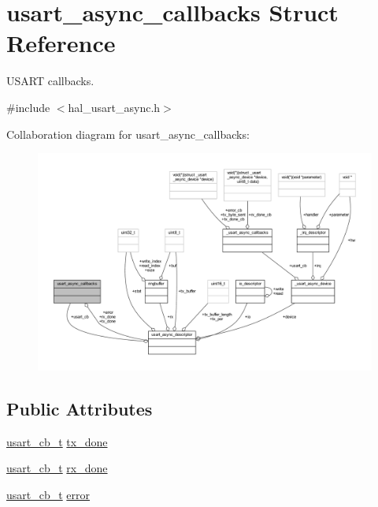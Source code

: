 \hypertarget{structusart__async__callbacks}{}\section{usart\+\_\+async\+\_\+callbacks Struct Reference}
\label{structusart__async__callbacks}


U\+S\+A\+RT callbacks.  




{\ttfamily \#include $<$hal\+\_\+usart\+\_\+async.\+h$>$}



Collaboration diagram for usart\+\_\+async\+\_\+callbacks\+:\nopagebreak
\begin{figure}[H]
\begin{center}
\leavevmode
\includegraphics[width=350pt]{structusart__async__callbacks__coll__graph}
\end{center}
\end{figure}
\subsection*{Public Attributes}
\begin{DoxyCompactItemize}
\item 
\hyperlink{group__doc__driver__hal__usart__async_ga430e4080a53e1f39c4d46da01200f633}{usart\+\_\+cb\+\_\+t} \hyperlink{structusart__async__callbacks_a3b40d7b9783136ddf7e9bf49b9598d08}{tx\+\_\+done}
\item 
\hyperlink{group__doc__driver__hal__usart__async_ga430e4080a53e1f39c4d46da01200f633}{usart\+\_\+cb\+\_\+t} \hyperlink{structusart__async__callbacks_a5363ee6cc91c18b9cec22fcfc7270895}{rx\+\_\+done}
\item 
\hyperlink{group__doc__driver__hal__usart__async_ga430e4080a53e1f39c4d46da01200f633}{usart\+\_\+cb\+\_\+t} \hyperlink{structusart__async__callbacks_a04f0dca1ca10974d9458dd11871a5b58}{error}
\end{DoxyCompactItemize}


